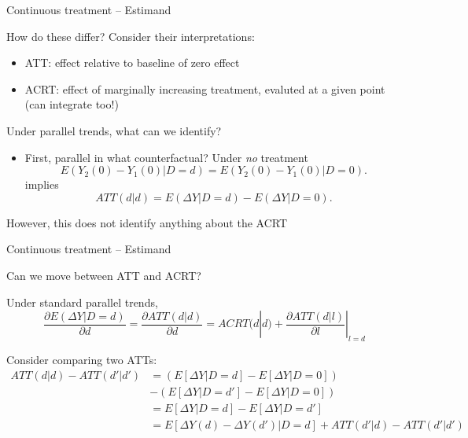 \documentclass[notes,11pt, aspectratio=169]{beamer}
\newenvironment{wideitemize}{\itemize\addtolength{\itemsep}{10pt}}{\enditemize}
\begin{document}
\begin{frame}{Continuous treatment -- Estimand}
  \begin{wideitemize}
  \item How do these differ? Consider their interpretations:
    \begin{itemize}
    \item ATT: effect relative to baseline of zero effect
    \item ACRT: effect of marginally increasing treatment, evaluted at a given point (can integrate too!)
    \end{itemize}
    \item Under parallel trends, what can we identify?
    \begin{itemize}
      \item First, parallel in what counterfactual? Under \emph{no} treatment
\begin{equation}
  E(Y_{2}(0) - Y_{1}(0) | D = d) = E(Y_{2}(0) - Y_{1}(0) | D = 0).
\end{equation}
implies
\begin{equation}
  ATT(d|d) = E(\Delta Y  | D = d) - E(\Delta Y | D = 0).
\end{equation}
    \end{itemize}
\item However, this does not identify anything about the ACRT

  \end{wideitemize}
\end{frame}

\begin{frame}{Continuous treatment -- Estimand}
  \begin{wideitemize}
    \item Can we move between ATT and ACRT?
    \item Under standard parallel trends,
    \begin{equation}
      \frac{\partial E(\Delta Y | D = d)}{\partial d} = \frac{\partial ATT(d|d)}{\partial d} = ACRT(d|d) + \frac{\partial ATT(d|l)}{\partial l}|_{l=d}
    \end{equation}
  \item Consider comparing two ATTs:
    \begin{align*}
      ATT(d | d) -  ATT(d' | d') &= \left(E[\Delta Y | D = d]  - E[\Delta Y | D=0]\right)\\
                                 &- \left(E[\Delta Y | D = d']  - E[\Delta Y | D=0]\right)\\
                                 &= E[\Delta Y | D = d]  - E[\Delta Y | D = d']\\
                                 &= E[\Delta Y(d) - \Delta Y(d') | D = d]  + ATT(d' | d) - ATT(d' | d')
    \end{align*}
  \end{wideitemize}
\end{frame}
\end{document}
